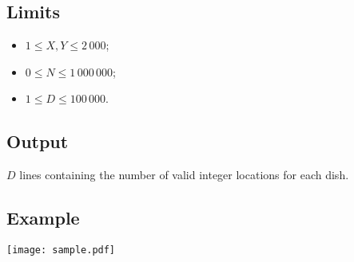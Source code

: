 \subsection*{Limits}

\begin{itemize}
\item $1 \leq X, Y \leq 2\,000$;
\item $0 \leq N \leq 1\,000\,000$;
\item $1 \leq D \leq 100\,000$.
\end{itemize}

\subsection*{Output}

$D$ lines containing the number of valid integer locations for each
dish.

\clearpage

\subsection*{Example}

\begin{center}
\texttt{[image: sample.pdf]}
\end{center}

